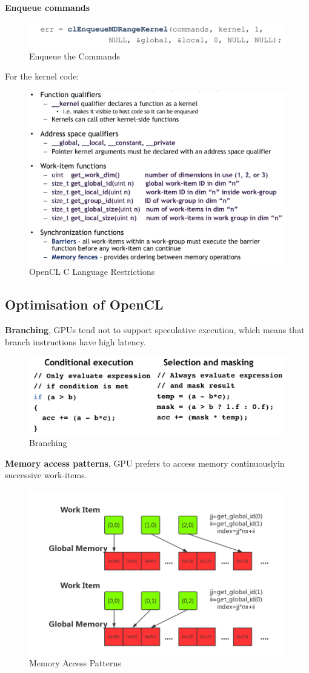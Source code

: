 \documentclass{article}
\begin{document}
\textbf{Enqueue commands}

\begin{figure}[h!]
    \centering
    \includegraphics[width=0.8\linewidth]{images/enqueue-commands.png}
    \caption{Enqueue the Commands}
    \label{fig:my_label}
\end{figure}


For the kernel code:

\begin{figure}[h]
    \centering
    \includegraphics[width=0.8\linewidth]{images/opencl-c-language-restrictions.png}
    \caption{OpenCL C Language Restrictions}
    \label{fig:my_label}
\end{figure}


\subsection{Optimisation of OpenCL}


\textbf{Branching}, GPUs tend not to support speculative execution, which means that branch instructions have high latency.

\begin{figure}[h!]
    \centering
    \includegraphics[width=0.5\linewidth]{images/branching.png}
    \caption{Branching}
    \label{fig:my_label}
\end{figure}



\textbf{Memory access patterns}, GPU  prefers  to  access  memory  continuouslyin  successive  work-items.

\begin{figure}[h!]
    \centering
    \includegraphics[width=0.5\linewidth]{images/memory-access-patterns.png}
    \caption{Memory Access Patterns}
    \label{fig:my_label}
\end{figure}
\end{document}
